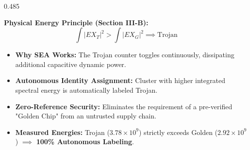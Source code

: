 \documentclass[aspectratio=169,11pt]{beamer}
\begin{document}
\begin{frame}[t]
\begin{columns}[T, onlytextwidth]
    \begin{column}{0.485\textwidth}
      \begin{glassbox}[top=2pt, bottom=2pt, left=6pt, right=6pt, title={Spectral Energy Analysis (SEA)}]{}
        \textbf{Physical Energy Principle (Section III-B):}
        {\setlength{\abovedisplayskip}{1.0pt}\setlength{\belowdisplayskip}{1.0pt}
        \begin{equation*}
          \int |EX_T|^2 > \int |EX_G|^2 \implies \text{Trojan}
        \end{equation*}}
        \begin{itemize}\setlength{\itemsep}{1.2pt}
          \item \textbf{Why SEA Works:} The Trojan counter toggles continuously, dissipating additional capacitive dynamic power.
          \item \textbf{Autonomous Identity Assignment:} Cluster with higher integrated spectral energy is automatically labeled Trojan.
          \item \textbf{Zero-Reference Security:} Eliminates the requirement of a pre-verified "Golden Chip" from an untrusted supply chain.
          \item \textbf{Measured Energies:} Trojan ($3.78 \times 10^9$) strictly exceeds Golden ($2.92 \times 10^9$) $\implies$ \textbf{100\% Autonomous Labeling}.
        \end{itemize}
      \end{glassbox}
    \end{column}
  \end{columns}
\end{frame}
\end{document}
